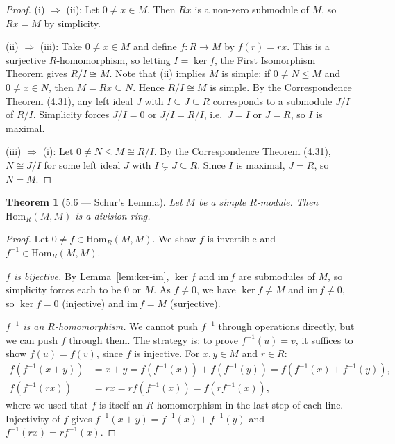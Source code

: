 \documentclass[12pt]{article}
\newtheorem{theorem}{Theorem}
\begin{document}
\begin{proof}
(i) $\Rightarrow$ (ii): Let $0 \neq x \in M$. Then $Rx$ is a non-zero submodule of $M$, so $Rx = M$ by simplicity.

(ii) $\Rightarrow$ (iii): Take $0 \neq x \in M$ and define $f : R \to M$ by $f(r) = rx$. This is a surjective $R$-homomorphism, so letting $I = \ker f$, the First Isomorphism Theorem gives $R/I \cong M$. Note that (ii) implies $M$ is simple: if $0 \neq N \leq M$ and $0 \neq x \in N$, then $M = Rx \subseteq N$. Hence $R/I \cong M$ is simple. By the Correspondence Theorem (4.31), any left ideal $J$ with $I \subseteq J \subseteq R$ corresponds to a submodule $J/I$ of $R/I$. Simplicity forces $J/I = 0$ or $J/I = R/I$, i.e.\ $J = I$ or $J = R$, so $I$ is maximal.

(iii) $\Rightarrow$ (i): Let $0 \neq N \leq M \cong R/I$. By the Correspondence Theorem (4.31), $N \cong J/I$ for some left ideal $J$ with $I \subsetneq J \subseteq R$. Since $I$ is maximal, $J = R$, so $N = M$.
\end{proof}

\begin{theorem}[5.6 — Schur's Lemma]
Let $M$ be a simple $R$-module. Then $\mathrm{Hom}_R(M,M)$ is a division ring.
\end{theorem}

\begin{proof}
Let $0 \neq f \in \mathrm{Hom}_R(M,M)$. We show $f$ is invertible and $f^{-1} \in \mathrm{Hom}_R(M,M)$.

\textit{$f$ is bijective.} By Lemma~\ref{lem:ker-im}, $\ker f$ and $\mathrm{im}\, f$ are submodules of $M$, so simplicity forces each to be $0$ or $M$. As $f \neq 0$, we have $\ker f \neq M$ and $\mathrm{im}\, f \neq 0$, so $\ker f = 0$ (injective) and $\mathrm{im}\, f = M$ (surjective).

\textit{$f^{-1}$ is an $R$-homomorphism.} We cannot push $f^{-1}$ through operations directly, but we can push $f$ through them. The strategy is: to prove $f^{-1}(u) = v$, it suffices to show $f(u) = f(v)$, since $f$ is injective. For $x, y \in M$ and $r \in R$:
\begin{align*}
  f\!\left(f^{-1}(x+y)\right) &= x + y = f(f^{-1}(x)) + f(f^{-1}(y)) = f\!\left(f^{-1}(x) + f^{-1}(y)\right), \\
  f\!\left(f^{-1}(rx)\right)  &= rx = rf(f^{-1}(x)) = f\!\left(rf^{-1}(x)\right),
\end{align*}
where we used that $f$ is itself an $R$-homomorphism in the last step of each line. Injectivity of $f$ gives $f^{-1}(x+y) = f^{-1}(x) + f^{-1}(y)$ and $f^{-1}(rx) = rf^{-1}(x)$.
\end{proof}
\end{document}
